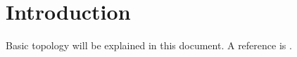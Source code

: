 \section{Introduction}
\label{section-introduction}

\noindent
Basic topology will be explained in this document.
A reference is \cite{Engelking}.

